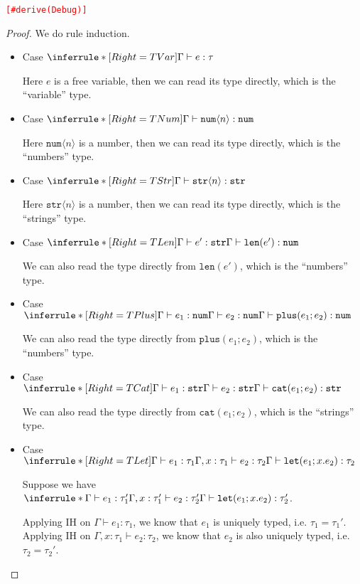 \documentclass{article}
\theoremstyle{definition}
\newcommand{\ip}[1]{\langle #1 \rangle}
\begin{document}
\noindent\textcolor{red}{\texttt{[\#derive(Debug)]}}
\begin{proof}
    We do rule induction.
    \begin{itemize}
        \item Case $\inferrule*[Right=TVar]{ }{\Gamma \vdash e : \tau}$

              Here $e$ is a free variable, then we can read its type directly, which is the ``variable'' type.
        \item Case $\inferrule*[Right=TNum]{ }{\Gamma \vdash \mathtt{num}\ip{n} : \mathtt{num}}$

              Here $\mathtt{num}\ip{n}$ is a number, then we can read its type directly, which is the ``numbers'' type.
        \item Case $\inferrule*[Right=TStr]{ }{\Gamma \vdash \mathtt{str}\ip{n} : \mathtt{str}}$

              Here $\mathtt{str}\ip{n}$ is a number, then we can read its type directly, which is the ``strings'' type.
        \item Case $\inferrule*[Right=TLen]{\Gamma \vdash e':\mathtt{str}}{\Gamma \vdash \mathtt{len}(e') : \mathtt{num}}$

              We can also read the type directly from $\mathtt{len}(e')$, which is the ``numbers'' type.
        \item Case $\inferrule*[Right=TPlus]{\Gamma \vdash e_1:\mathtt{num}\\ \Gamma \vdash e_2:\mathtt{num}}{\Gamma \vdash \mathtt{plus}(e_1;e_2) : \mathtt{num}}$

              We can also read the type directly from $\mathtt{plus}(e_1;e_2)$, which is the ``numbers'' type.
        \item Case $\inferrule*[Right=TCat]{\Gamma \vdash e_1:\mathtt{str}\\ \Gamma \vdash e_2:\mathtt{str}}{\Gamma \vdash \mathtt{cat}(e_1;e_2) : \mathtt{str}}$

              We can also read the type directly from $\mathtt{cat}(e_1;e_2)$, which is the ``strings'' type.
        \item \color{red}
              Case $\inferrule*[Right=TLet]{\Gamma \vdash e_1:\tau_1 \\ \Gamma,x:\tau_1 \vdash e_2:\tau_2}{\Gamma \vdash \mathtt{let}(e_1;x.e_2) : \tau_2}$

              Suppose we have $\inferrule*{\Gamma \vdash e_1:\tau_1' \\ \Gamma,x:\tau_1' \vdash e_2:\tau_2'}{\Gamma \vdash \mathtt{let}(e_1;x.e_2) : \tau_2'}$.

              Applying IH on $\Gamma \vdash e_1:\tau_1$, we know that $e_1$ is uniquely typed, i.e. $\tau_1 = \tau_1'$.
              Applying IH on $\Gamma,x:\tau_1 \vdash e_2:\tau_2$, we know that $e_2$ is also uniquely typed, i.e. $\tau_2 = \tau_2'$.
              \color{black}
    \end{itemize}
\end{proof}
\end{document}
